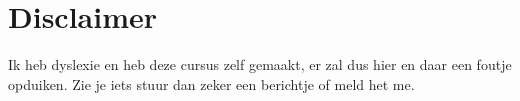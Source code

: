 \documentclass{ximera}
\begin{document}





\section*{Disclaimer}
Ik heb dyslexie en heb deze cursus zelf gemaakt, er zal dus hier en daar een foutje opduiken. Zie je iets stuur dan zeker een berichtje of meld het me.
\end{document}
